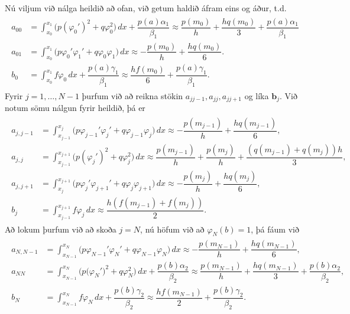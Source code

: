 \documentclass[a4paper,10pt,icelandic]{sphinxmanual}
\begin{document}
Nú viljum við nálga heildið að ofan, við getum haldið áfram eins og áður, t.d.
\begin{equation*}
\begin{split}\begin{aligned}
a_{00}&=\int_{x_0}^{x_1}\big(p(\varphi_0')^2+q\varphi_0^2\big)\, dx+
\dfrac{p(a)\alpha_1}{\beta_1}
\approx \dfrac{p(m_0)}{h}+\dfrac{h q(m_0)}3+\dfrac{p(a)\alpha_1}{\beta_1}
\\
a_{01}&=
\int_{x_0}^{x_1}\big(p\varphi_0'\varphi_1'+q\varphi_0\varphi_1\big)\,
dx
\approx -\dfrac{p(m_0)}{h}+\dfrac{h q(m_0)}6.
\\
b_0&=\int_{x_0}^{x_1}f\varphi_0\, dx+\dfrac{p(a)\gamma_1}{\beta_1}
\approx \dfrac{h f(m_0)}6+\dfrac{p(a)\gamma_1}{\beta_1}.\end{aligned}\end{split}
\end{equation*}
Fyrir \(j=1, \dots, N-1\) þurfum við að reikna stökin \(a_{jj-1},a_{jj},a_{jj+1}\) og líka \(\mathbf{b}_j\). Við notum sömu nálgun fyrir heildið, þá er
\begin{equation*}
\begin{split}\begin{aligned}
a_{j,j-1}&=\int_{x_{j-1}}^{x_j}
\big( p\varphi_{j-1}'\varphi_j'+q\varphi_{j-1}\varphi_j\big)\, dx
\approx -\dfrac{p(m_{j-1})}{h}+\dfrac{h q(m_{j-1})}6,\\
a_{j,j}&=\int_{x_{j-1}}^{x_{j+1}}
\big( p(\varphi_j')^2+q \varphi_j^2\big)\, dx
\approx \dfrac{p(m_{j-1})}{h}+\dfrac{p(m_j)}{h}
+\dfrac{(q(m_{j-1})+ q(m_j))h}3,\\
a_{j,j+1}&=\int_{x_j}^{x_{j+1}}
\big( p\varphi_j'\varphi_{j+1}'+q \varphi_j\varphi_{j+1}\big)\, dx
\approx -\dfrac{p(m_j)}{h}
+\dfrac{h q(m_j)}6,\\
b_j&=\int_{x_{j-1}}^{x_{j+1}}f\varphi_j\, dx
\approx \dfrac{h (f(m_{j-1})+f(m_j))}2.\end{aligned}\end{split}
\end{equation*}
Að lokum þurfum við að skoða \(j=N\), nú höfum við að \(\varphi_N(b)=1\), þá fáum við
\begin{equation*}
\begin{split}\begin{aligned}
a_{N,N-1}&=\int_{x_{N-1}}^{x_N}
\big( p\varphi_{N-1}'\varphi_N'+q\varphi_{N-1}\varphi_N\big)\, dx
\approx -\dfrac{p(m_{N-1})}{h}+\dfrac{h q(m_{N-1})}6,\\
a_{NN}&=\int_{x_{N-1}}^{x_{N}}
\big( p\big(\varphi_N'\big)^2+q\varphi_N^2\big)\, dx
+\dfrac{p(b)\alpha_2}{\beta_2}
\approx \dfrac{p(m_{N-1})}{h}
+\dfrac{h q(m_{N-1})}3+\dfrac{p(b)\alpha_2}{\beta_2},\\
b_N&=\int_{x_{N-1}}^{x_{N}}f\varphi_N\, dx+\dfrac{p(b)\gamma_2}{\beta_2}
\approx \dfrac{h f(m_{N-1})}2+\dfrac{p(b)\gamma_2}{\beta_2}.\end{aligned}\end{split}
\end{equation*}
\end{document}
